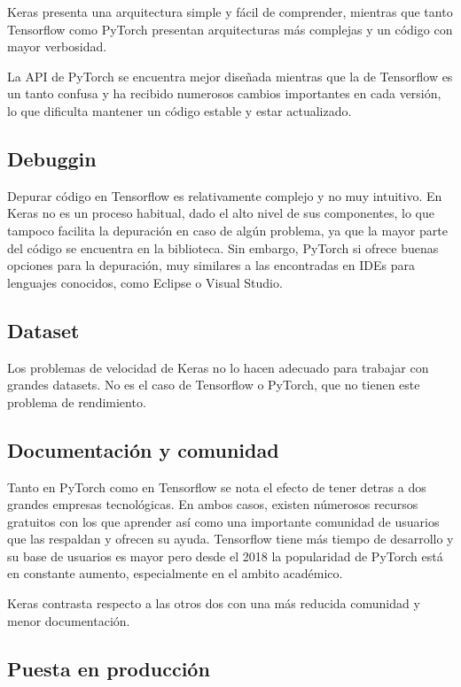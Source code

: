 Keras presenta una arquitectura simple y fácil de comprender, mientras
que tanto Tensorflow como PyTorch presentan arquitecturas más complejas
y un código con mayor verbosidad.

La API de PyTorch se encuentra mejor diseñada mientras que la de
Tensorflow es un tanto confusa y ha recibido numerosos cambios
importantes en cada versión, lo que dificulta mantener un código estable
y estar actualizado.

\subsection{Debuggin}\label{debuggin}

Depurar código en Tensorflow es relativamente complejo y no muy
intuitivo. En Keras no es un proceso habitual, dado el alto nivel de sus
componentes, lo que tampoco facilita la depuración en caso de algún
problema, ya que la mayor parte del código se encuentra en la biblioteca.
Sin embargo, PyTorch si ofrece buenas opciones para la depuración, muy
similares a las encontradas en IDEs para lenguajes conocidos, como
Eclipse o Visual Studio.

\subsection{Dataset}\label{dataset}

Los problemas de velocidad de Keras no lo hacen adecuado para trabajar
con grandes datasets. No es el caso de Tensorflow o PyTorch, que no
tienen este problema de rendimiento.

\subsection{Documentación y comunidad}\label{documentacion-y-comunidad}

Tanto en PyTorch como en Tensorflow se nota el efecto de tener detras a
dos grandes empresas tecnológicas. En ambos casos, existen númerosos
recursos gratuitos con los que aprender así como una importante
comunidad de usuarios que las respaldan y ofrecen su ayuda. Tensorflow
tiene más tiempo de desarrollo y su base de usuarios es mayor pero desde
el 2018 la popularidad de PyTorch está en constante aumento,
especialmente en el ambito académico.

Keras contrasta respecto a las otros dos con una más reducida comunidad
y menor documentación.

\subsection{Puesta en producción}\label{puesta-en-produccion}

